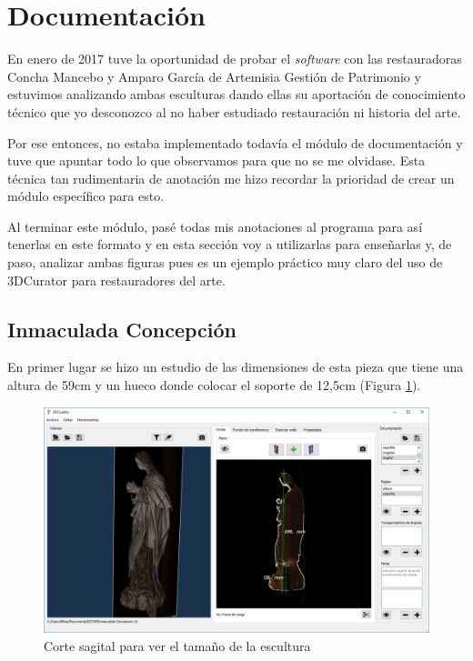 \section{Documentación}

En enero de 2017 tuve la oportunidad de probar el \textit{software} con las restauradoras Concha Mancebo y Amparo García de Artemisia Gestión de Patrimonio y estuvimos analizando ambas esculturas dando ellas su aportación de conocimiento técnico que yo desconozco al no haber estudiado restauración ni historia del arte.

Por ese entonces, no estaba implementado todavía el módulo de documentación y tuve que apuntar todo lo que observamos para que no se me olvidase. Esta técnica tan rudimentaria de anotación me hizo recordar la prioridad de crear un módulo específico para esto.

Al terminar este módulo, pasé todas mis anotaciones al programa para así tenerlas en este formato y en esta sección voy a utilizarlas para enseñarlas y, de paso, analizar ambas figuras pues es un ejemplo práctico muy claro del uso de 3DCurator para restauradores del arte.

\subsection{Inmaculada Concepción}

En primer lugar se hizo un estudio de las dimensiones de esta pieza que tiene una altura de 59cm y un hueco donde colocar el soporte de 12,5cm (Figura \ref{fig:resultados/documentacion/inmaculada-concepcion/sagital}).

\begin{figure}[H]
	\centering
	\includegraphics[width=12.5cm]{imagenes/resultados/documentacion/inmaculada-concepcion/sagital}
	\caption{Corte sagital para ver el tamaño de la escultura}
	\label{fig:resultados/documentacion/inmaculada-concepcion/sagital}
\end{figure}

